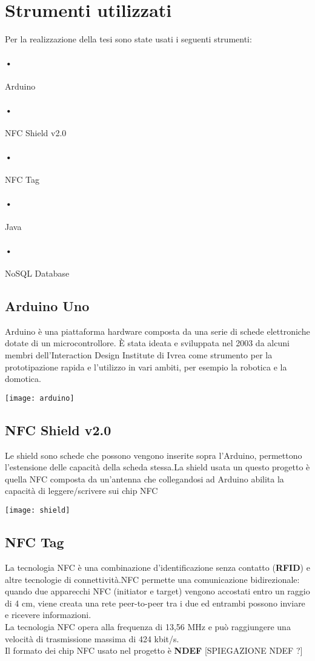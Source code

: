 \section{Strumenti utilizzati}

Per la realizzazione della tesi sono state usati i seguenti strumenti:
\paragraph{•} Arduino 
\paragraph{•} NFC Shield v2.0
\paragraph{•} NFC Tag
\paragraph{•} Java
\paragraph{•} NoSQL Database

\subsection{Arduino Uno}
Arduino è una piattaforma hardware composta da una serie di schede elettroniche dotate di un microcontrollore. È stata ideata e sviluppata nel 2003 da alcuni membri dell'Interaction Design Institute di Ivrea come strumento per la prototipazione rapida e l'utilizzo in vari ambiti, per esempio la robotica e la domotica.
\begin{center}
\texttt{[image: arduino]}
\end{center}
\subsection{NFC Shield v2.0}
Le shield sono schede che possono vengono inserite sopra l'Arduino, permettono l'estensione delle capacità della scheda stessa.La shield usata un questo progetto è quella NFC composta da un'antenna che collegandosi ad Arduino abilita la capacità di leggere/scrivere sui chip NFC
\begin{center}
\texttt{[image: shield]}
\end{center}
\subsection{NFC Tag}
La tecnologia NFC  è una combinazione d'identificazione senza contatto (\textbf{RFID}) e altre tecnologie di connettività.NFC permette una comunicazione bidirezionale: quando due apparecchi NFC (initiator e target) vengono accostati entro un raggio di 4 cm, viene creata una rete peer-to-peer tra i due ed entrambi possono inviare e ricevere informazioni.
\\La tecnologia NFC opera alla frequenza di 13,56 MHz e può raggiungere una velocità di trasmissione massima di 424 kbit/s.
\\Il formato dei chip NFC usato nel progetto è \textbf{NDEF} [SPIEGAZIONE NDEF ?]
